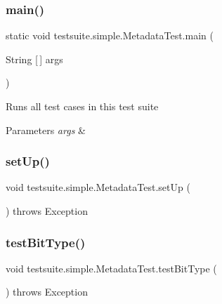 \subsubsection{\texorpdfstring{main()}{main()}}
{\footnotesize\ttfamily static void testsuite.\+simple.\+Metadata\+Test.\+main (\begin{DoxyParamCaption}\item[{String \mbox{[}$\,$\mbox{]}}]{args }\end{DoxyParamCaption})\hspace{0.3cm}{\ttfamily [static]}}

Runs all test cases in this test suite


\begin{DoxyParams}{Parameters}
{\em args} & \\
\hline
\end{DoxyParams}
\mbox{\label{classtestsuite_1_1simple_1_1_metadata_test_ae893b849e04ac78a5f340f55afb2cb5c}} 
\subsubsection{\texorpdfstring{set\+Up()}{setUp()}}
{\footnotesize\ttfamily void testsuite.\+simple.\+Metadata\+Test.\+set\+Up (\begin{DoxyParamCaption}{ }\end{DoxyParamCaption}) throws Exception}

\mbox{\label{classtestsuite_1_1simple_1_1_metadata_test_aa762c68b17236baad08ad296668292b7}} 
\subsubsection{\texorpdfstring{test\+Bit\+Type()}{testBitType()}}
{\footnotesize\ttfamily void testsuite.\+simple.\+Metadata\+Test.\+test\+Bit\+Type (\begin{DoxyParamCaption}{ }\end{DoxyParamCaption}) throws Exception}

